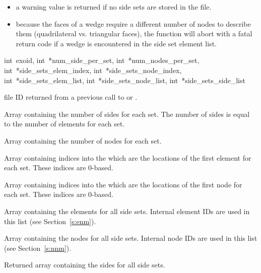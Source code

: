 \begin{itemize}
 \item a warning value is returned if no side sets are stored in the
 file.

 \item because the faces of a wedge require a different number of
 nodes to describe them (quadrilateral vs. triangular faces), the
 function will abort with a fatal return code if a wedge is
 encountered in the side set element list.
\end{itemize}

{int~exoid, 
int~*num_side_per_set,
int~*num_nodes_per_set, 
int~*side_sets_elem_index,
int~*side_sets_node_index, 
int~*side_sets_elem_list,
int~*side_sets_node_list, 
int~*side_sets_side_list}

\begin{parameters}
\item[{int exoid \R{}}]
\exo{} file ID returned from a previous call to  
or .

\item[{int* num_side_per_set \R{}}]
Array containing the number of sides for each set. The number 
of sides is equal to the number of elements for each set.

\item[{int* num_nodes_per_set \R{}}]
Array containing the number of nodes for each set.

\item[{int* side_sets_elem_index \R{}}]
Array containing indices into the  which are
the locations of the first element for each set. These indices are
0-based.

\item[{int* side_sets_node_index \R{}}]
Array containing indices into the  
which are the locations of the first node for each set. These 
indices are 0-based.

\item[{int* side_sets_elem_list \R{}}]
Array containing the elements for all side sets. Internal element IDs
are used in this list (see Section~\ref{s:enm}).

\item[{int* side_sets_node_list \R{}}]
Array containing the nodes for all side sets. Internal node 
IDs are used in this list (see  Section~\ref{s:nnm}).

\item[{int* side_sets_side_list \W{}}]
Returned array containing the sides for all side sets.
\end{parameters}

